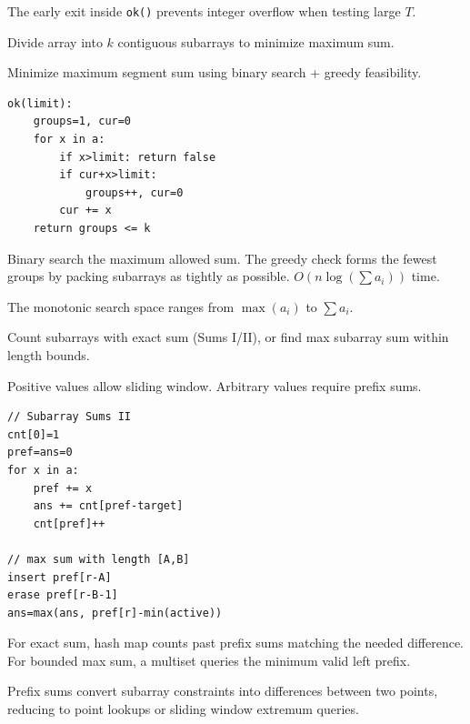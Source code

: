 \Analysis The early exit inside \texttt{ok()} prevents integer overflow when testing large $T$.


\Problem Divide array into $k$ contiguous subarrays to minimize maximum sum.

Minimize maximum segment sum using binary search + greedy feasibility.
\begin{lstlisting}
ok(limit):
    groups=1, cur=0
    for x in a:
        if x>limit: return false
        if cur+x>limit:
            groups++, cur=0
        cur += x
    return groups <= k
\end{lstlisting}

\Solution Binary search the maximum allowed sum. The greedy check forms the fewest groups by packing subarrays as tightly as possible. $O(n \log (\sum a_i))$ time.

\Analysis The monotonic search space ranges from $\max(a_i)$ to $\sum a_i$.


\Problem Count subarrays with exact sum (Sums I/II), or find max subarray sum within length bounds.

Positive values allow sliding window. Arbitrary values require prefix sums.
\begin{lstlisting}
// Subarray Sums II
cnt[0]=1
pref=ans=0
for x in a:
    pref += x
    ans += cnt[pref-target]
    cnt[pref]++

// max sum with length [A,B]
insert pref[r-A]
erase pref[r-B-1]
ans=max(ans, pref[r]-min(active))
\end{lstlisting}

\Solution For exact sum, hash map counts past prefix sums matching the needed difference. For bounded max sum, a multiset queries the minimum valid left prefix.

\Analysis Prefix sums convert subarray constraints into differences between two points, reducing to point lookups or sliding window extremum queries.
